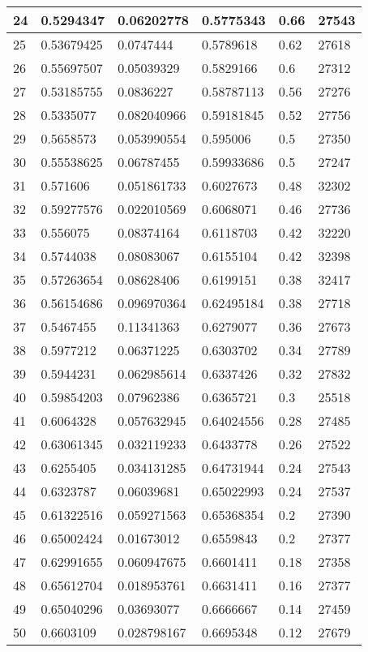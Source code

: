 \begin{longtable}{|l|l|l|l|l|l|}
24 & 0.5294347 & 0.06202778 & 0.5775343 & 0.66 & 27543 \\ \hline 
25 & 0.53679425 & 0.0747444 & 0.5789618 & 0.62 & 27618 \\ \hline 
26 & 0.55697507 & 0.05039329 & 0.5829166 & 0.6 & 27312 \\ \hline 
27 & 0.53185755 & 0.0836227 & 0.58787113 & 0.56 & 27276 \\ \hline 
28 & 0.5335077 & 0.082040966 & 0.59181845 & 0.52 & 27756 \\ \hline 
29 & 0.5658573 & 0.053990554 & 0.595006 & 0.5 & 27350 \\ \hline 
30 & 0.55538625 & 0.06787455 & 0.59933686 & 0.5 & 27247 \\ \hline 
31 & 0.571606 & 0.051861733 & 0.6027673 & 0.48 & 32302 \\ \hline 
32 & 0.59277576 & 0.022010569 & 0.6068071 & 0.46 & 27736 \\ \hline 
33 & 0.556075 & 0.08374164 & 0.6118703 & 0.42 & 32220 \\ \hline 
34 & 0.5744038 & 0.08083067 & 0.6155104 & 0.42 & 32398 \\ \hline 
35 & 0.57263654 & 0.08628406 & 0.6199151 & 0.38 & 32417 \\ \hline 
36 & 0.56154686 & 0.096970364 & 0.62495184 & 0.38 & 27718 \\ \hline 
37 & 0.5467455 & 0.11341363 & 0.6279077 & 0.36 & 27673 \\ \hline 
38 & 0.5977212 & 0.06371225 & 0.6303702 & 0.34 & 27789 \\ \hline 
39 & 0.5944231 & 0.062985614 & 0.6337426 & 0.32 & 27832 \\ \hline 
40 & 0.59854203 & 0.07962386 & 0.6365721 & 0.3 & 25518 \\ \hline 
41 & 0.6064328 & 0.057632945 & 0.64024556 & 0.28 & 27485 \\ \hline 
42 & 0.63061345 & 0.032119233 & 0.6433778 & 0.26 & 27522 \\ \hline 
43 & 0.6255405 & 0.034131285 & 0.64731944 & 0.24 & 27543 \\ \hline 
44 & 0.6323787 & 0.06039681 & 0.65022993 & 0.24 & 27537 \\ \hline 
45 & 0.61322516 & 0.059271563 & 0.65368354 & 0.2 & 27390 \\ \hline 
46 & 0.65002424 & 0.01673012 & 0.6559843 & 0.2 & 27377 \\ \hline 
47 & 0.62991655 & 0.060947675 & 0.6601411 & 0.18 & 27358 \\ \hline 
48 & 0.65612704 & 0.018953761 & 0.6631411 & 0.16 & 27377 \\ \hline 
49 & 0.65040296 & 0.03693077 & 0.6666667 & 0.14 & 27459 \\ \hline 
50 & 0.6603109 & 0.028798167 & 0.6695348 & 0.12 & 27679 \\ \hline 
\end{longtable}